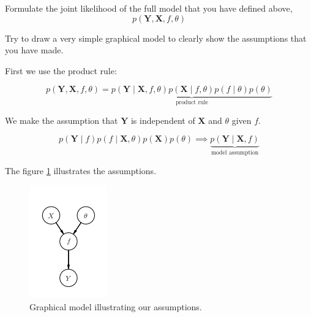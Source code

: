 \documentclass[12pt]{article}
\newenvironment{question}[2][Question]{\begin{trivlist}
\kern10pt
\item[\hskip \labelsep {\bfseries #1}\hskip \labelsep {\bfseries #2.}]}{\end{trivlist}}
\newcommand*{\answer}{%
  \par
  \kern1pt
  \begingroup
    \centering
    \raisebox{.2\baselineskip}{%
      \textcolor{gray}{
	    \rule{.6667\linewidth}{.1pt}%
      }
    }%
    \par
  \kern8pt
  \endgroup
}
\begin{document}
\begin{question}{9}
Formulate the joint likelihood of the full model that you have defined above,
$$p(\boldsymbol{Y, X}, f, θ)$$

Try to draw a very simple graphical model to clearly show the assumptions that you have made.

\answer

First we use the product rule:

\begin{equation}
p(\boldsymbol{Y}, \boldsymbol{X}, f, \theta) = \underbrace{p(\boldsymbol{Y} \mid \boldsymbol{X}, f, \theta) p(\boldsymbol{X} \mid f, \theta) p(f \mid \theta) p(\theta)}_{\text{product rule}}
\end{equation}

We make the assumption that $\boldsymbol{Y}$ is independent of $\boldsymbol{X}$ and $\theta$ given $f$.

\begin{equation}p(\boldsymbol{Y} \mid f) p(f \mid \boldsymbol{X}, \theta) p(\boldsymbol{X})p(\theta) \implies \underbrace{p(\boldsymbol{Y} \mid \boldsymbol{X}, f)}_{\text{model assumption}}
\end{equation}

The figure \ref{graph_model} illustrates the assumptions.

\begin{figure}
\includegraphics[]{graph_model}
\centering
\caption{Graphical model illustrating our assumptions.}
\label{graph_model}
\end{figure}

\end{question}
\end{document}
